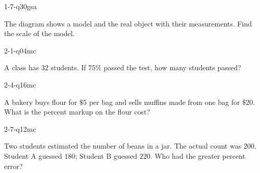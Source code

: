 \begin{practiceQuestion}{1-7-q30}{gsa}
\begin{questionText}
The diagram shows a model and the real object with their measurements. Find the scale of the model.

\begin{center}
\end{center}
\end{questionText}
\end{practiceQuestion}

\begin{practiceQuestion}{2-1-q04}{mc}
\begin{questionText}
A class has $32$ students. If $75\%$ passed the test, how many students passed?
\end{questionText}
\end{practiceQuestion}

\begin{practiceQuestion}{2-4-q16}{mc}
\begin{questionText}
A bakery buys flour for $\$5$ per bag and sells muffins made from one bag for $\$20$. What is the percent markup on the flour cost?
\end{questionText}
\end{practiceQuestion}

\begin{practiceQuestion}{2-7-q12}{mc}
\begin{questionText}
Two students estimated the number of beans in a jar. The actual count was $200$. Student A guessed $180$; Student B guessed $220$. Who had the greater percent error?
\end{questionText}
\end{practiceQuestion}

